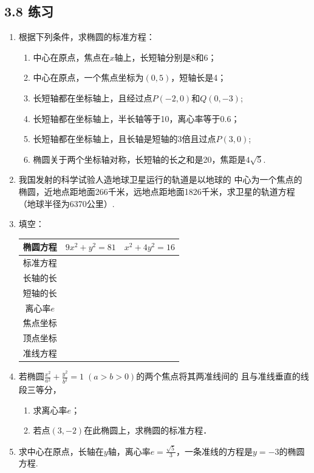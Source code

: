 \subsection*{3.8 练习}
\begin{enumerate}
    \item 根据下列条件，求椭圆的标准方程：
\begin{enumerate}[(1)]
\item 中心在原点，焦点在$x$轴上，长短轴分别是8和6；
\item 中心在原点，一个焦点坐标为$(0,5)$，短轴长是4；
\item 长短轴都在坐标轴上，且经过点$P(-2,0)$和$Q(0,-3)$;
\item 长短轴都在坐标轴上，半长轴等于10，离心率等于0.6；
\item 长短轴都在坐标轴上，且长轴是短轴的3倍且过点$P(3,0)$;
\item 椭圆关于两个坐标轴对称，长短轴的长之和是20，焦距是$4\sqrt{5}$.
\end{enumerate}

\item 我国发射的科学试验人造地球卫星运行的轨道是以地球的
    中心为一个焦点的椭圆，近地点距地面266千米，远地点距地面1826千米，求卫星的轨道方程（地球半径为6370公里）.
    \item 填空：
\begin{center}
\begin{tabular}{c|cc}
    \hline
椭圆方程&$9x^2+y^2=81$&$x^2+4y^2=16$\\
\hline
标准方程\\
长轴的长\\
短轴的长\\
离心率$e$\\
焦点坐标\\
顶点坐标\\
准线方程\\
\hline
\end{tabular}
\end{center}

\item 若椭圆$\frac{x^2}{a^2}+\frac{y^2}{b^2}=1\; (a>b>0)$的两个焦点将其两准线间的
且与准线垂直的线段三等分，
\begin{enumerate}[(1)]
\item 求离心率$e$；
\item 若点$(3,-2)$在此椭圆上，求椭圆的标准方程．
\end{enumerate}

\item 求中心在原点，长轴在$y$轴，离心率$e=\frac{\sqrt{5}}{3}$，一条准线的方程是$y=-3$的椭圆方程.
\end{enumerate}


